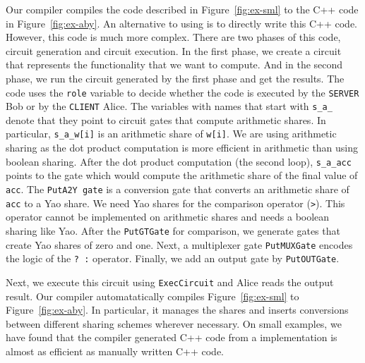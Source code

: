 Our compiler compiles the code described in Figure~\ref{fig:ex-sml} to the C++ code in
Figure~\ref{fig:ex-aby}. An alternative to using \tool is to directly write this C++ code.
However, this code is much more complex. 
There are two phases of this code, circuit generation and circuit execution.
In the first phase, we create a circuit that represents the functionality that we want to compute.
And in the second phase, we run the circuit generated by the first phase and get the results.
The code uses the
{\tt role} variable to decide whether the code is executed by the {\tt SERVER} Bob or by
the {\tt CLIENT} Alice. The variables with names that start with {\tt s\_a\_} denote that
they point to circuit gates that compute arithmetic shares. In particular, {\tt s\_a\_w[i]} 
is an arithmetic share of {\tt w[i]}.
We are using arithmetic sharing as the dot product computation is more efficient in arithmetic
than using boolean sharing.
After the dot product computation (the second loop), {\tt s\_a\_acc}  points to the gate
which would compute the arithmetic share of the final value of {\tt acc}.
The {\tt PutA2Y gate} is a conversion gate that converts an arithmetic share of
{\tt acc} to a Yao share. We need Yao shares for the comparison operator ({\tt >}).
This operator cannot be implemented on arithmetic shares and needs a boolean sharing like Yao.
After the {\tt PutGTGate} for comparison, we generate gates that create Yao shares of zero and one.
Next, a multiplexer gate {\tt PutMUXGate} encodes the logic of the {\tt ? :} operator.
Finally, we add an output gate by {\tt PutOUTGate}.

Next, we execute this circuit using {\tt ExecCircuit} and Alice reads the output result.
Our compiler automatatically compiles Figure~\ref{fig:ex-sml} to Figure~\ref{fig:ex-aby}.
In particular, it manages the shares and inserts conversions between different sharing schemes
wherever necessary. 
On small examples, we have found that the compiler generated C++ code from a \tool implementation 
is almost as efficient as manually written C++ code.
